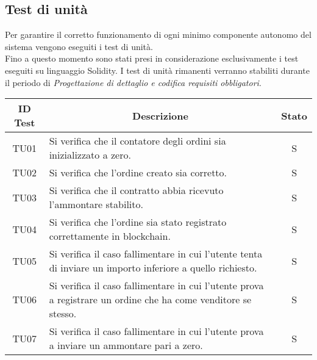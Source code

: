 \vspace{1cm}
\subsection{Test di unità}\label{subsection:test_unita}
Per garantire il corretto funzionamento di ogni minimo componente autonomo del sistema vengono eseguiti i test di unità. \\
Fino a questo momento sono stati presi in considerazione esclusivamente i test eseguiti su linguaggio Solidity\glo{}.
I test di unità rimanenti verranno stabiliti durante il periodo di \textit{Progettazione di dettaglio e codifica requisiti obbligatori}.

\begin{table}[H]
  \centering
  \renewcommand{\arraystretch}{1.8}
  \begin{tabular}{c|p{10cm}|c}
    \rowcolor[HTML]{125E28}
    \color[HTML]{FFFFFF}\textbf{ID Test}
         & \multicolumn{1}{c}{\color[HTML]{FFFFFF}\textbf{Descrizione}}
         & \color[HTML]{FFFFFF}\textbf{Stato}                                                                                                    \\
    \hline
    TU01 & Si verifica che il contatore degli ordini sia inizializzato a zero.                                                               & S \\
    TU02 & Si verifica che l'ordine creato sia corretto.                                                                                     & S \\
    TU03 & Si verifica che il contratto abbia ricevuto l'ammontare stabilito.                                                                & S \\
    TU04 & Si verifica che l'ordine sia stato registrato correttamente in blockchain\glo{}.                                                        & S \\
    TU05 & Si verifica il caso fallimentare in cui l'utente tenta di inviare un importo inferiore a quello richiesto.                        & S \\
    TU06 & Si verifica il caso fallimentare in cui l'utente prova a registrare un ordine che ha come venditore se stesso.                    & S \\
    TU07 & Si verifica il caso fallimentare in cui l'utente prova a inviare un ammontare pari a zero.                                        & S \\

\end{tabular}
\end{table}
